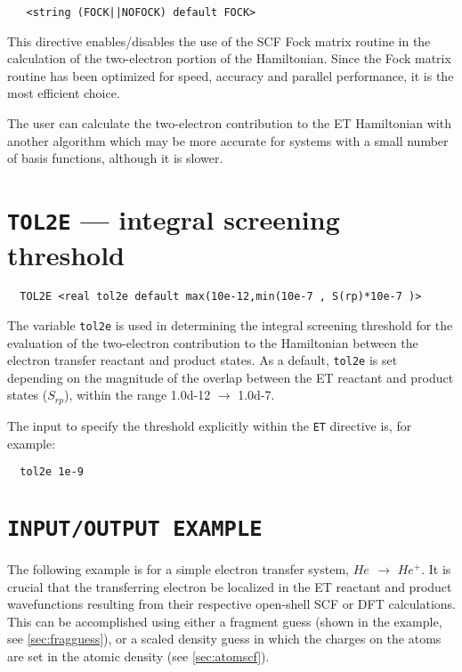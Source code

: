  \begin{verbatim}
   <string (FOCK||NOFOCK) default FOCK>
 \end{verbatim}

This directive enables/disables the use of the SCF Fock matrix 
routine in the calculation of the two-electron portion of the Hamiltonian.
Since the Fock matrix routine has been optimized for speed, accuracy and parallel performance,
it is the most efficient choice.

The user can calculate the two-electron contribution to the ET Hamiltonian
with another algorithm which may be more accurate for systems with a small
number of basis functions, although it is slower.

\section{{\tt TOL2E} --- integral screening threshold}
\label{sec:tol2e}

\begin{verbatim}
  TOL2E <real tol2e default max(10e-12,min(10e-7 , S(rp)*10e-7 )> 
\end{verbatim}

The variable \verb+tol2e+ is used in determining the integral
screening threshold for the evaluation of the two-electron contribution to the Hamiltonian
between the electron transfer reactant and product states.
As a default, \verb+tol2e+ is set depending on the magnitude
of the overlap between the ET reactant and product states ($S_{rp}$), within the range 1.0d-12 $\rightarrow$ 1.0d-7.

The input to specify the threshold explicitly within the \verb+ET+
directive is, for example:

\begin{verbatim}
  tol2e 1e-9
\end{verbatim}

\section{{\tt INPUT/OUTPUT EXAMPLE}}

The following example is for a simple electron transfer system, $He_{}$ $\rightarrow$ $He^{ +}$.
It is crucial that the transferring electron be localized in the ET reactant and product
wavefunctions resulting from their respective open-shell SCF or DFT calculations. This can be accomplished
using either a fragment guess (shown in the example, see \ref{sec:fragguess}), or a scaled density 
guess in which the charges on the atoms
are set in the atomic density (see \ref{sec:atomscf}).

